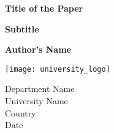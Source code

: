 \documentclass[12pt]{article}
\begin{document}
\begin{titlepage}
    \centering
    \vspace*{1cm}
    
    \textbf{\LARGE Title of the Paper}
    
    \vspace{0.5cm}
    
    \textbf{\large Subtitle}
    
    \vspace{1.5cm}
    
    \textbf{Author's Name}
    
    \vfill
    
    \texttt{[image: university\_logo]}
    
    \vspace{0.8cm}
    
    Department Name\\
    University Name\\
    Country\\
    Date
    
\end{titlepage}
\end{document}
